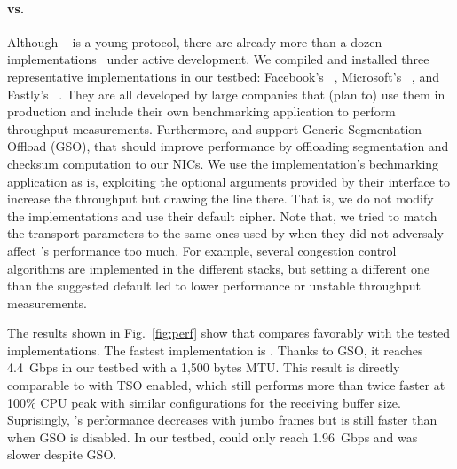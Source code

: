 \paragraph{\tcpls vs. \quic}
Although \quic~\cite{draft-ietf-quic-transport} is a young protocol, there are
already more than a dozen implementations~\cite{marx2020same,quicimplem,yang2020making} under active
development. We compiled and installed three representative \quic implementations in our testbed: Facebook's \mvfst~\cite{mvfst-github,Joras_mvfst}, Microsoft's \msquic~\cite{msquic-github}, and Fastly's
\quicly~\cite{quicly-github}. They are all developed by large companies that (plan to) use them in production and include their own benchmarking application to perform throughput measurements. Furthermore, \mvfst and \quicly support Generic Segmentation Offload (GSO), that should improve performance by offloading \udp segmentation and checksum computation to our NICs. We use the
implementation's bechmarking application as is, exploiting the optional
arguments provided by their interface to increase the throughput but drawing the
line there. That is, we do not modify the \quic implementations and use their default cipher. Note that, we tried to match the transport parameters to the same ones used by \tcpls when they did not adversaly affect \quic's performance too much. For example, several congestion control algorithms are implemented in the different \quic stacks, but setting a different one than the suggested default led to lower performance or unstable throughput measurements.

The results shown in Fig.~\ref{fig:perf} show that \tcpls compares favorably
with the tested \quic implementations. The fastest \quic implementation is
\quicly. Thanks to GSO, it reaches 4.4~Gbps in our testbed with a 1,500 bytes
MTU. This result is directly comparable to \tcpls with TSO enabled, which still
performs more than twice faster at 100\% CPU peak with similar configurations
for the receiving buffer size. Suprisingly, \quicly's performance decreases with
jumbo frames but is still faster than when GSO is disabled. In our testbed,
\msquic could only reach 1.96~Gbps and \mvfst was slower despite GSO.




